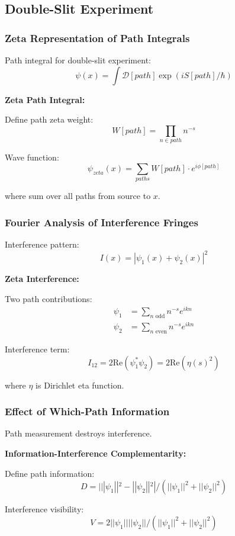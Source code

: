 \documentclass[11pt]{article}
\theoremstyle{plain}
\theoremstyle{definition}
\theoremstyle{remark}
\begin{document}
\subsection{Double-Slit Experiment}

\subsubsection{Zeta Representation of Path Integrals}

Path integral for double-slit experiment:
$$\psi(x) = \int \mathcal{D}[path] \exp(iS[path]/\hbar)$$

\textbf{Zeta Path Integral:}

Define path zeta weight:
$$W[path] = \prod_{n \in path} n^{-s}$$

Wave function:
$$\psi_{zeta}(x) = \sum_{paths} W[path] \cdot e^{i\phi[path]}$$

where sum over all paths from source to $x$.

\subsubsection{Fourier Analysis of Interference Fringes}

Interference pattern:
$$I(x) = |\psi_1(x) + \psi_2(x)|^2$$

\textbf{Zeta Interference:}

Two path contributions:
\begin{align}
\psi_1 &= \sum_{n \text{ odd}} n^{-s} e^{ikn} \\
\psi_2 &= \sum_{n \text{ even}} n^{-s} e^{ikn}
\end{align}

Interference term:
$$I_{12} = 2\text{Re}(\psi_1^* \psi_2) = 2\text{Re}(\eta(s)^2)$$

where $\eta$ is Dirichlet eta function.

\subsubsection{Effect of Which-Path Information}

Path measurement destroys interference.

\textbf{Information-Interference Complementarity:}

Define path information:
$$D = |||\psi_1||^2 - ||\psi_2||^2| / (||\psi_1||^2 + ||\psi_2||^2)$$

Interference visibility:
$$V = 2||\psi_1|| ||\psi_2|| / (||\psi_1||^2 + ||\psi_2||^2)$$
\end{document}
